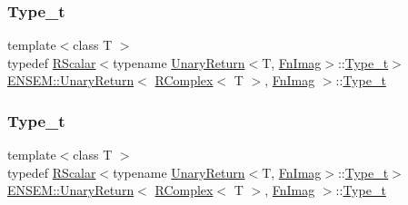 \subsubsection{\texorpdfstring{Type\_t}{Type\_t}\hspace{0.1cm}{\footnotesize\ttfamily [1/3]}}
{\footnotesize\ttfamily template$<$class T $>$ \\
typedef \mbox{\hyperlink{classENSEM_1_1RScalar}{R\+Scalar}}$<$typename \mbox{\hyperlink{structENSEM_1_1UnaryReturn}{Unary\+Return}}$<$T, \mbox{\hyperlink{structENSEM_1_1FnImag}{Fn\+Imag}}$>$\+::\mbox{\hyperlink{structENSEM_1_1UnaryReturn_3_01RComplex_3_01T_01_4_00_01FnImag_01_4_a5e8cda9513c7e5cb0b7182122bd82513}{Type\+\_\+t}}$>$ \mbox{\hyperlink{structENSEM_1_1UnaryReturn}{E\+N\+S\+E\+M\+::\+Unary\+Return}}$<$ \mbox{\hyperlink{classENSEM_1_1RComplex}{R\+Complex}}$<$ T $>$, \mbox{\hyperlink{structENSEM_1_1FnImag}{Fn\+Imag}} $>$\+::\mbox{\hyperlink{structENSEM_1_1UnaryReturn_3_01RComplex_3_01T_01_4_00_01FnImag_01_4_a5e8cda9513c7e5cb0b7182122bd82513}{Type\+\_\+t}}}

\mbox{\label{structENSEM_1_1UnaryReturn_3_01RComplex_3_01T_01_4_00_01FnImag_01_4_a5e8cda9513c7e5cb0b7182122bd82513}} 
\subsubsection{\texorpdfstring{Type\_t}{Type\_t}\hspace{0.1cm}{\footnotesize\ttfamily [2/3]}}
{\footnotesize\ttfamily template$<$class T $>$ \\
typedef \mbox{\hyperlink{classENSEM_1_1RScalar}{R\+Scalar}}$<$typename \mbox{\hyperlink{structENSEM_1_1UnaryReturn}{Unary\+Return}}$<$T, \mbox{\hyperlink{structENSEM_1_1FnImag}{Fn\+Imag}}$>$\+::\mbox{\hyperlink{structENSEM_1_1UnaryReturn_3_01RComplex_3_01T_01_4_00_01FnImag_01_4_a5e8cda9513c7e5cb0b7182122bd82513}{Type\+\_\+t}}$>$ \mbox{\hyperlink{structENSEM_1_1UnaryReturn}{E\+N\+S\+E\+M\+::\+Unary\+Return}}$<$ \mbox{\hyperlink{classENSEM_1_1RComplex}{R\+Complex}}$<$ T $>$, \mbox{\hyperlink{structENSEM_1_1FnImag}{Fn\+Imag}} $>$\+::\mbox{\hyperlink{structENSEM_1_1UnaryReturn_3_01RComplex_3_01T_01_4_00_01FnImag_01_4_a5e8cda9513c7e5cb0b7182122bd82513}{Type\+\_\+t}}}

